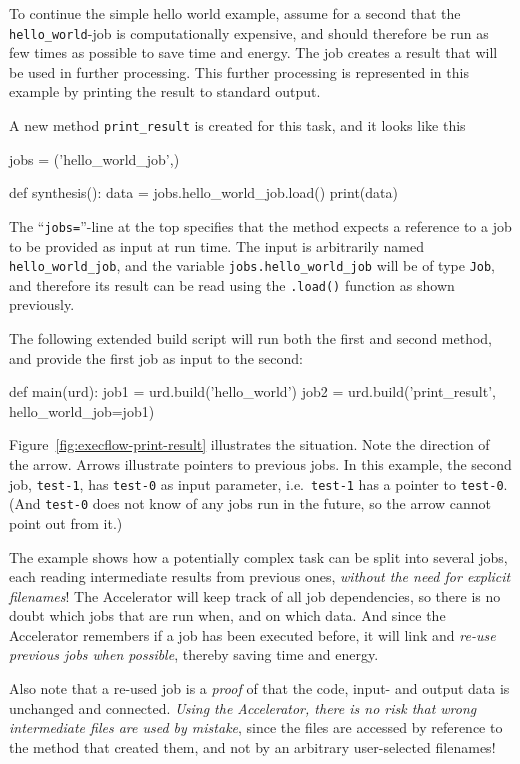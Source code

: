 To continue the simple hello world example, assume for a second that
the \texttt{hello\_world}-job is computationally expensive, and should
therefore be run as few times as possible to save time and energy.
The job creates a result that will be used in further processing.
This further processing is represented in this example by printing the
result to standard output.

\clearpage

\noindent A new method \texttt{print\_result} is
created for this task, and it looks like this
\begin{python}
jobs = ('hello_world_job',)

def synthesis():
    data = jobs.hello_world_job.load() 
    print(data)
\end{python}
The ``\texttt{jobs=}''-line at the top specifies that the method
expects a reference to a job to be provided as input at run time.  The
input is arbitrarily named \texttt{hello\_world\_job}, and the
variable \texttt{jobs.hello\_world\_job} will be of type \texttt{Job}, and
therefore its result can be read using the \texttt{.load()} function
as shown previously.

The following extended build script will run both the first and second
method, and provide the first job as input to the second:
\begin{python}
def main(urd):
    job1 = urd.build('hello_world')
    job2 = urd.build('print_result', hello_world_job=job1)
\end{python}

Figure~\ref{fig:execflow-print-result} illustrates the situation.
Note the direction of the arrow.  Arrows illustrate pointers to
previous jobs.  In this example, the second job, \texttt{test-1}, has
\texttt{test-0} as input parameter, i.e.\ \texttt{test-1} has a
pointer to \texttt{test-0}.  (And \texttt{test-0} does not know of any
jobs run in the future, so the arrow cannot point out from it.)

The example shows how a potentially complex task can be split into
several jobs, each reading intermediate results from previous ones,
\emph{without the need for explicit filenames}!  The Accelerator will
keep track of all job dependencies, so there is no doubt which jobs
that are run when, and on which data.  And since the Accelerator
remembers if a job has been executed before, it will link and
\emph{re-use previous jobs when possible}, thereby saving time and
energy.

Also note that a re-used job is a \emph{proof} of that the code,
input- and output data is unchanged and connected.  \emph{Using the
Accelerator, there is no risk that wrong intermediate files are used
by mistake}, since the files are accessed by reference to the method
that created them, and not by an arbitrary user-selected filenames!


